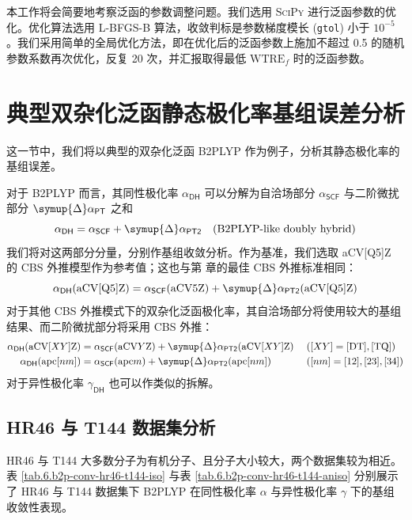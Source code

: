本工作将会简要地考察泛函的参数调整问题。我们选用 \textsc{SciPy}\cite{Virtanen-Vazquez-Baeza.NM.2020} 进行泛函参数的优化。优化算法选用 L-BFGS-B 算法\cite{Byrd-Zhu.SJSC.1995}，收敛判标是参数梯度模长 (\verb|gtol|) 小于 $10^{-5}$。我们采用简单的全局优化方法，即在优化后的泛函参数上施加不超过 0.5 的随机参数系数再次优化，反复 20 次，并汇报取得最低 $\mathrm{WTRE}_f$ 时的泛函参数。

\section{典型双杂化泛函静态极化率基组误差分析}
\label{sec.6.basis-converg}

这一节中，我们将以典型的双杂化泛函 B2PLYP 作为例子，分析其静态极化率的基组误差。

对于 B2PLYP 而言，其同性极化率 $\alpha_\textsf{DH}$ 可以分解为自洽场部分 $\alpha_\textsf{SCF}$ 与二阶微扰部分 $\symup{\Delta} \alpha_\textsf{PT}$ 之和
\begin{equation*}
    \alpha_\textsf{DH} = \alpha_\textsf{SCF} + \symup{\Delta} \alpha_\textsf{PT2} \quad \text{(B2PLYP-like doubly hybrid)}
\end{equation*}
我们将对这两部分分量，分别作基组收敛分析。作为基准，我们选取 aCV[Q5]Z 的 CBS 外推模型作为参考值；这也与第  章的最佳 CBS 外推标准相同：
\begin{equation*}
    \alpha_\textsf{DH} (\text{aCV[Q5]Z}) = \alpha_\textsf{SCF} (\text{aCV5Z}) + \symup{\Delta} \alpha_\textsf{PT2} (\text{aCV[Q5]Z})
\end{equation*}
对于其他 CBS 外推模式下的双杂化泛函极化率，其自洽场部分将使用较大的基组结果、而二阶微扰部分将采用 CBS 外推：
\begin{align*}
    \alpha_\textsf{DH} (\text{aCV}[XY]\text{Z}) &= \alpha_\textsf{SCF} (\text{aCV}Y\text{Z}) + \symup{\Delta} \alpha_\textsf{PT2} (\text{aCV}[XY]\text{Z}) \; &&([XY] = \mathrm{[DT], [TQ]}) \\
    \alpha_\textsf{DH} (\text{apc}[nm]) &= \alpha_\textsf{SCF} (\text{apc}m) + \symup{\Delta} \alpha_\textsf{PT2} (\text{apc}[nm]) \; &&([nm] = [12], [23], [34])
\end{align*}
对于异性极化率 $\gamma_\textsf{DH}$ 也可以作类似的拆解。

\subsection{HR46 与 T144 数据集分析}

HR46 与 T144 大多数分子为有机分子、且分子大小较大，两个数据集较为相近。表 \ref{tab.6.b2p-conv-hr46-t144-iso} 与表 \ref{tab.6.b2p-conv-hr46-t144-aniso} 分别展示了 HR46 与 T144 数据集下 B2PLYP 在同性极化率 $\alpha$ 与异性极化率 $\gamma$ 下的基组收敛性表现。


